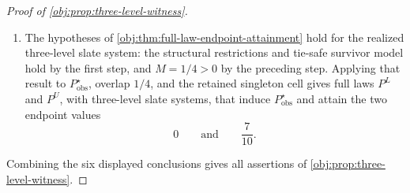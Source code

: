 \begin{proof}[Proof of \cref{obj:prop:three-level-witness}]
\begin{enumerate}
\item The hypotheses of \cref{obj:thm:full-law-endpoint-attainment} hold for the realized three-level slate system: the structural restrictions and tie-safe survivor model hold by the first step, and \(M=1/4>0\) by the preceding step.  Applying that result to \(P_{\mathrm{obs}}^{\star}\), overlap \(1/4\), and the retained singleton cell gives full laws \(P^L\) and \(P^U\), with three-level slate systems, that induce \(P_{\mathrm{obs}}^{\star}\) and attain the two endpoint values
\[
0
\qquad\text{and}\qquad
\frac{7}{10}.
\]
\end{enumerate}
Combining the six displayed conclusions gives all assertions of \cref{obj:prop:three-level-witness}. %
\end{proof}

